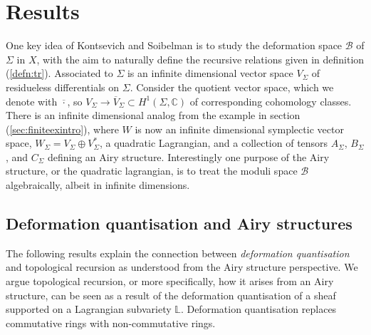     
    
    \section{Results}
    
    

    

    
    
    
    One key idea of Kontsevich and Soibelman is to study \cite{ks_airy} the deformation space \( \mathcal{B}\) of \(\Sigma\) in \(X\), with the aim to naturally define the recursive relations given in definition (\ref{defn:tr}). Associated to \( \Sigma\) is an infinite dimensional vector space \(V_\Sigma\) of residueless differentials on \(\Sigma\). Consider the quotient vector space, which we denote with \( \overline{\cdot}\), so \( V_\Sigma \rightarrow \overline{V}_\Sigma \subset H^1( \Sigma, \mathbb{C}) \) of corresponding cohomology classes. There is an infinite dimensional analog from the example in section (\ref{sec:finiteexintro}), where \(W\) is now an infinite dimensional symplectic vector space, \(W_\Sigma = V_\Sigma \oplus V_\Sigma^*\), a quadratic Lagrangian, and a collection of tensors \( A_\Sigma\), \(B_\Sigma\), and \(C_\Sigma\) defining an Airy structure. Interestingly one purpose of the Airy structure, or the quadratic lagrangian, is to treat the moduli space \(\mathcal{B}\) algebraically, albeit in infinite dimensions.

    
    \subsection{Deformation quantisation and Airy structures}
    
    The following results explain the connection between \emph{deformation quantisation} and topological recursion as understood from the Airy structure perspective. We argue topological recursion, or more specifically, how it arises from an Airy structure, can be seen as a result of the deformation quantisation of a sheaf supported on a Lagrangian subvariety \( \mathbb{L}\). 
    Deformation quantisation replaces commutative rings with non-commutative rings.
    
